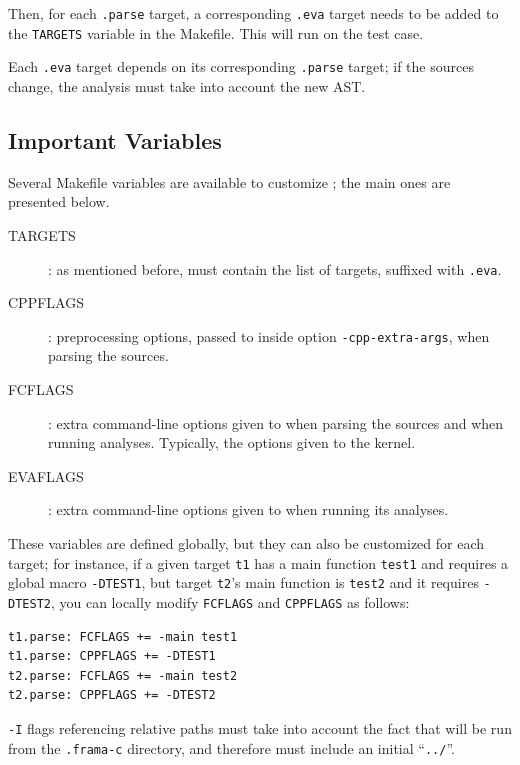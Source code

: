 Then, for each \texttt{.parse} target, a corresponding \texttt{.eva} target
needs to be added to the \texttt{TARGETS} variable in the Makefile.
This will run \Value on the test case.

Each \texttt{.eva} target depends on its corresponding \texttt{.parse} target;
if the sources change, the analysis must take into account the new AST.

\subsection{Important Variables}

Several Makefile variables are available to customize \FramaC; the main
ones are presented below.

\begin{description}
\item[TARGETS]: as mentioned before, must contain the list of targets,
  suffixed with \texttt{.eva}.
\item[CPPFLAGS]: preprocessing options, passed to \FramaC inside option
  \texttt{-cpp-extra-args}, when parsing the sources.
\item[FCFLAGS]: extra command-line options given to \FramaC when parsing the
  sources and when running analyses. Typically, the options given to the
  \FramaC kernel.
\item[EVAFLAGS]: extra command-line options given to \Value when running
  its analyses.
\end{description}

These variables are defined globally, but they can also be customized for
each target; for instance, if a given target \texttt{t1} has a main
function \texttt{test1} and requires a global macro \texttt{-DTEST1}, but
target \texttt{t2}'s main function is \texttt{test2} and it requires
\texttt{-DTEST2}, you can locally modify \texttt{FCFLAGS} and \texttt{CPPFLAGS}
as follows:

\begin{lstlisting}
t1.parse: FCFLAGS += -main test1
t1.parse: CPPFLAGS += -DTEST1
t2.parse: FCFLAGS += -main test2
t2.parse: CPPFLAGS += -DTEST2
\end{lstlisting}

\begin{important}
\texttt{-I} flags referencing relative paths must take into account the
fact that \FramaC will be run from the \texttt{.frama-c} directory, and
therefore must include an initial ``\texttt{../}''.
\end{important}

